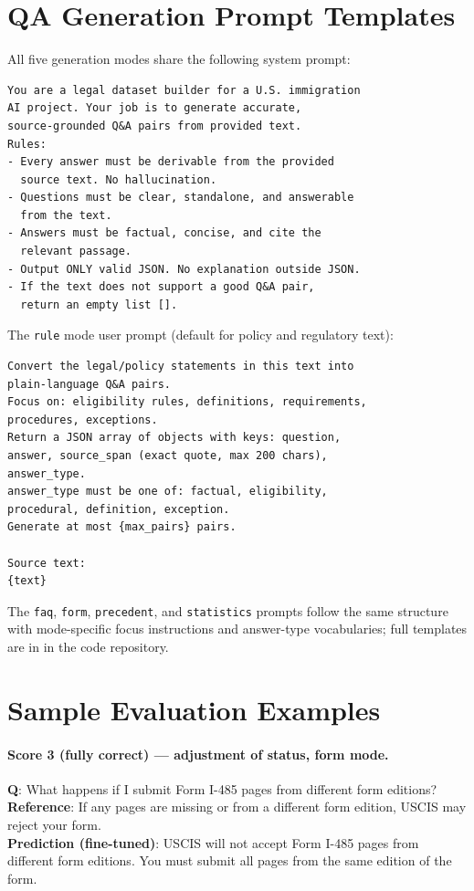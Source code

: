 \documentclass[11pt]{article}
\begin{document}



\appendix
\section{QA Generation Prompt Templates}
\label{app:prompts}

All five generation modes share the following system prompt:

\begin{lstlisting}
You are a legal dataset builder for a U.S. immigration
AI project. Your job is to generate accurate,
source-grounded Q&A pairs from provided text.
Rules:
- Every answer must be derivable from the provided
  source text. No hallucination.
- Questions must be clear, standalone, and answerable
  from the text.
- Answers must be factual, concise, and cite the
  relevant passage.
- Output ONLY valid JSON. No explanation outside JSON.
- If the text does not support a good Q&A pair,
  return an empty list [].
\end{lstlisting}

The \texttt{rule} mode user prompt (default for policy and regulatory text):

\begin{lstlisting}
Convert the legal/policy statements in this text into
plain-language Q&A pairs.
Focus on: eligibility rules, definitions, requirements,
procedures, exceptions.
Return a JSON array of objects with keys: question,
answer, source_span (exact quote, max 200 chars),
answer_type.
answer_type must be one of: factual, eligibility,
procedural, definition, exception.
Generate at most {max_pairs} pairs.

Source text:
{text}
\end{lstlisting}

The \texttt{faq}, \texttt{form}, \texttt{precedent}, and \texttt{statistics} prompts follow the same structure with mode-specific focus instructions and answer-type vocabularies; full templates are in  in the code repository.

\section{Sample Evaluation Examples}
\label{app:samples}

\paragraph{Score 3 (fully correct) --- adjustment of status, form mode.}
\textbf{Q}: What happens if I submit Form I-485 pages from different form editions?\\
\textbf{Reference}: If any pages are missing or from a different form edition, USCIS may reject your form.\\
\textbf{Prediction (fine-tuned)}: USCIS will not accept Form I-485 pages from different form editions. You must submit all pages from the same edition of the form.
\end{document}
